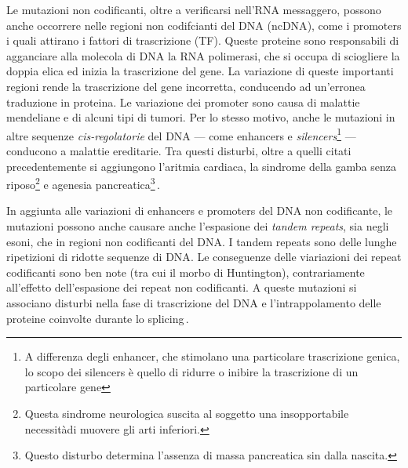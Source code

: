 Le mutazioni non codificanti, oltre a verificarsi nell'\acs{RNA} messaggero, possono anche occorrere nelle regioni non codifcianti del \acs{DNA} (\acs{ncDNA}), come i promoters i quali attirano i fattori di trascrizione (\acs{TF}). Queste proteine sono responsabili di agganciare alla molecola di \acs{DNA} la \acs{RNA} polimerasi, che si occupa di sciogliere la doppia elica ed inizia la trascrizione del gene. La variazione di queste importanti regioni rende la trascrizione del gene incorretta, conducendo ad un'erronea traduzione in proteina. Le variazione dei promoter sono causa di malattie mendeliane e di alcuni tipi di tumori. Per lo stesso motivo, anche le mutazioni in altre sequenze \textsl{cis-regolatorie} del \acs{DNA} — come enhancers e \textit{silencers}\footnote{A differenza degli enhancer, che stimolano una particolare trascrizione genica, lo scopo dei silencers è quello di ridurre o inibire la trascrizione di un particolare gene} — conducono a malattie ereditarie. Tra questi disturbi, oltre a quelli citati precedentemente si aggiungono l'aritmia cardiaca, la sindrome della gamba senza riposo\footnote{Questa sindrome neurologica suscita al soggetto una insopportabile necessitàdi muovere gli arti inferiori.} e agenesia pancreatica\footnote{Questo disturbo determina l'assenza di massa pancreatica sin dalla nascita.}\,\cite{zhang2015non, french2020role, pagni2022non, khurana2016role}.

In aggiunta alle variazioni di enhancers e promoters del \acs{DNA} non codificante, le mutazioni possono anche causare anche l'espasione dei \textit{tandem repeats}, sia negli esoni, che in regioni non codificanti del \acs{DNA}. I tandem repeats sono delle lunghe ripetizioni di ridotte sequenze di \acs{DNA}. Le conseguenze delle viariazioni dei repeat codificanti sono ben note (tra cui il morbo di Huntington), contrariamente all'effetto dell'espasione dei repeat non codificanti. A queste mutazioni si associano disturbi nella fase di trascrizione del \acs{DNA} e l'intrappolamento delle proteine coinvolte durante lo splicing\,\cite{french2020role}.


